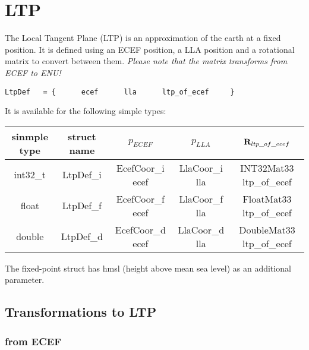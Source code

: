 \section{LTP}\label{LTP}
The Local Tangent Plane (LTP) is an approximation of the earth at a fixed position. It is defined using an ECEF position, a LLA position and a rotational matrix to convert between them. \emph{Please note that the matrix transforms from ECEF to ENU!}
\begin{verbatim}
LtpDef   = {      ecef      lla      ltp_of_ecef     }
\end{verbatim}
It is available for the following simple types:\\
\begin{tabular}{c|cccc}
sinmple type & struct name & $p_{ECEF}$ & $p_{LLA}$ & $\mat R_{ltp\_of\_ecef}$\\  \hline 
int32\_t & LtpDef\_i & EcefCoor\_i  ecef & LlaCoor\_i   lla & INT32Mat33 ltp\_of\_ecef\\
float & LtpDef\_f & EcefCoor\_f  ecef & LlaCoor\_f   lla & FloatMat33 ltp\_of\_ecef\\
double & LtpDef\_d & EcefCoor\_d  ecef & LlaCoor\_d   lla & DoubleMat33 ltp\_of\_ecef 
\end{tabular} 
The fixed-point struct has hmsl (height above mean sea level) as an additional parameter.

\subsection{Transformations to LTP}
\subsubsection*{from ECEF}
